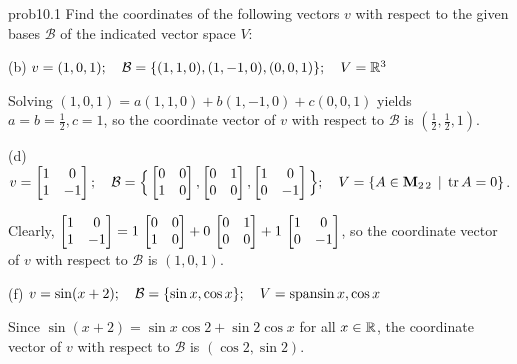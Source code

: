 
\begin{sol}{prob10.1} Find the coordinates of the following vectors $v$ with respect to the given bases $\mathcal B$ of the indicated vector space $V$:\medskip


(b) $v=(1,0, 1); \quad\mathcal B=\{(1,1, 0), (1, -1, 0),(0,0,1)  \};\quad V=\mathbb{R}^3$

\soln Solving $ (1,0, 1)=a (1,1, 0)+b (1, -1, 0)+c(0,0,1)$ yields $a=b=\frac12, c=1$, so the coordinate vector of $v$ with respect to  $\mathcal B$ is $(\frac12,\frac12,1)$.\medskip

(d) $v=\bmatrix 1&0\\1&-1\endbmatrix;\quad \mathcal B=\Big\{\bmatrix 0&0\\1&0\endbmatrix, \bmatrix 0&1\\0&0\endbmatrix , \bmatrix 1&0\\0&-1\endbmatrix \Big\};\quad V=\set{A \in  \M_{2 \,2}  \st \tr A=0}$.

\soln Clearly, $\bmatrix 1&0\\1&-1\endbmatrix= 1\,\bmatrix 0&0\\1&0\endbmatrix+0\, \bmatrix 0&1\\0&0\endbmatrix + 1\, \bmatrix 1&0\\0&-1\endbmatrix $, so the coordinate vector of $v$ with respect to  $\mathcal B$ is $(1,0,1)$.
\medskip


(f) $v =\sin (x+2);\quad \mathcal B=\{\sin x, \cos x  \};\quad V=\textrm{span}{\sin x, \cos x }$

\soln Since $\sin (x+2) = \sin x \cos 2 + \sin 2 \cos x $ for all $x \in \mathbb{R}$, the coordinate vector of $v$ with respect to  $\mathcal B$ is $(\cos 2,\sin 2)$.\medskip
%
 

\end{sol}



